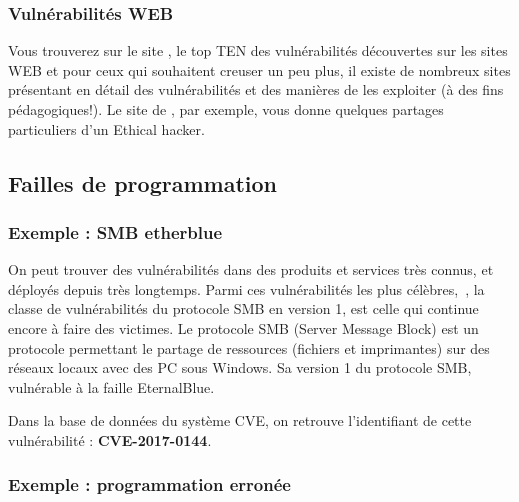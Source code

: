 

\subsubsection{Vulnérabilités WEB}

Vous trouverez sur le site , le top TEN des vulnérabilités découvertes sur les sites WEB
et pour ceux qui souhaitent creuser un peu plus, il existe de nombreux sites présentant en détail des vulnérabilités et des manières de les exploiter (à des fins pédagogiques!). Le site de , par exemple, vous donne quelques partages particuliers d'un Ethical hacker.

\subsection{Failles de programmation}

\subsubsection{Exemple : SMB etherblue}
On peut trouver des vulnérabilités dans des produits et services très connus, et déployés depuis très longtemps. 
Parmi ces vulnérabilités les plus célèbres,~, la classe de vulnérabilités du protocole SMB en version 1, est celle qui continue encore à faire des victimes.
Le protocole SMB (Server Message Block) est un protocole permettant le partage de ressources (fichiers et imprimantes) sur des réseaux locaux avec des PC sous Windows. Sa version 1 du protocole SMB, vulnérable à la faille EternalBlue.

Dans la base de données du système CVE, on retrouve l’identifiant de cette vulnérabilité : \textbf{CVE-2017-0144}. 

\subsubsection{Exemple : programmation erronée}

